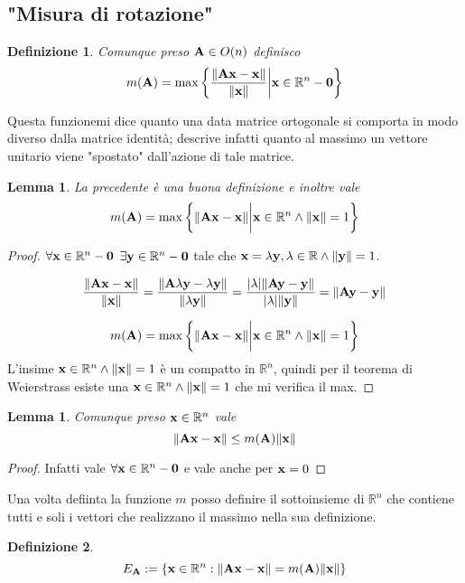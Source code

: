 \documentclass[10pt,a4paper]{article}
\newtheorem{definition}{Definizione}[section]
\newtheorem{lemma}[theorem]{Lemma}
\begin{document}
\subsection{"Misura di rotazione"}
\begin{definition}
Comunque preso  $  \vb{A} \in O(n) $  definisco
\[ m(\vb{A}) = \max \bigg\{ \frac{\norm{\vb{Ax-x}}}{\norm{\vb{x}}} \bigg|  \vb{x} \in \mathbb{R}^{n}-\vb{0} \bigg\} \]
\end{definition}
Questa funzionemi dice quanto una data matrice ortogonale si comporta in modo diverso dalla matrice identità; descrive infatti quanto al massimo un vettore unitario viene "spostato" dall'azione di tale matrice. 
\begin{lemma}
La precedente è una buona definizione e inoltre vale
\[ m(\vb{A}) = \max \bigg\{ \norm{\vb{Ax-x}} \bigg|  \vb{x} \in \mathbb{R}^{n} \land \norm{\vb{x}} = 1 \bigg\} \]
\end{lemma}

\begin{proof}
$ \forall \vb{x} \in \mathbb{R}^{n}-\vb{0}$  $ \exists \vb{y} \in \mathbb{R}^{n}-\vb{0} $ tale che \hfill $\vb{x} = \lambda \vb{y} , \lambda \in \mathbb{R} \land \norm{\vb{y}} = 1 $. 

\[ \frac{\norm{\vb{Ax-x}}}{\norm{\vb{x}}} = \frac{\norm{\vb{A}\lambda \vb{y}-\lambda \vb{y}}}{\norm{\lambda \vb{y}}} =   \frac{|\lambda| \norm{\vb{Ay-y}}}{|\lambda| \norm{\vb{ y}}} = \norm{\vb{Ay-y}} \]

\[ m(\vb{A}) = \max \bigg\{ \norm{\vb{Ax-x}} \bigg|  \vb{x} \in \mathbb{R}^{n} \land \norm{\vb{x}} = 1 \bigg\}\] L'insime $\vb{x} \in \mathbb{R}^{n} \land \norm{\vb{x}} = 1 $  è un compatto in  $\mathbb{R}^{n}$, quindi per il teorema di Weierstrass esiste una $\vb{x} \in \mathbb{R}^{n} \land \norm{\vb{x}} = 1$ che mi verifica il max. 
\end{proof}

\begin{lemma}
Comunque preso $ \vb{x} \in \mathbb{R}^{n}$  vale  \[ \norm{\vb{Ax-x}} \leq m(\vb{A}) \norm{\vb{x}} \]
\end{lemma}

\begin{proof}
Infatti vale $\forall \vb{x} \in \mathbb{R}^{n}-\vb{0}$  e vale anche per  $\vb{x}=0$
\end{proof}
Una volta defiinta la funzione $m$ posso definire il sottoinsieme di $\mathbb{R}^n$ che contiene tutti e soli i vettori che realizzano il massimo nella sua definizione. 
\begin{definition}
\[ E_{\vb{A}} := \{ \vb{x} \in \mathbb{R}^{n} :  \norm{\vb{Ax - x}} = m(\vb{A}) \norm{\vb{x}}\} \]
\end{definition}
\end{document}
